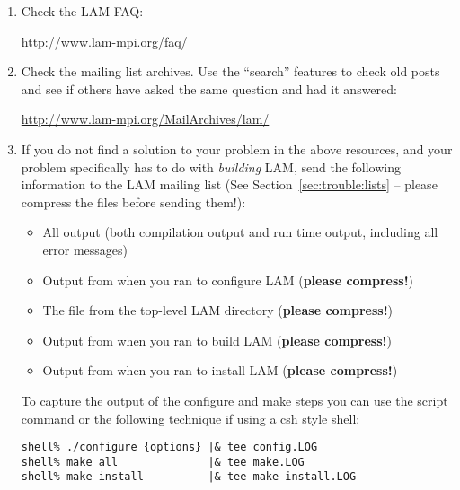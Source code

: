 \begin{enumerate}
\item Check the LAM FAQ:
 
  \vspace{11pt}

  \centerline{\url{http://www.lam-mpi.org/faq/}}
  
\item Check the mailing list archives.  Use the ``search'' features to
  check old posts and see if others have asked the same question and
  had it answered:
  
  \vspace{11pt}

  \centerline{\url{http://www.lam-mpi.org/MailArchives/lam/}}
  
\item If you do not find a solution to your problem in the above
  resources, and your problem specifically has to do with {\em
    building} LAM, send the following information to the LAM mailing
  list (See Section~\ref{sec:trouble:lists} -- please compress the
  files before sending them!):
  
  \begin{itemize}
  \item All output (both compilation output and run time output,
    including all error messages)
    
  \item Output from when you ran  to configure LAM
    ({\bf please compress!})
    
  \item The  file from the top-level LAM directory
    ({\bf please compress!})
    
  \item Output from when you ran  to build LAM ({\bf please
      compress!})
    
  \item Output from when you ran  to install LAM
    ({\bf please compress!})
  \end{itemize}

  To capture the output of the configure and make steps you can use
  the script command or the following technique if using a csh style
  shell:

\lstset{style=lam-cmdline}
\begin{lstlisting}
shell% ./configure {options} |& tee config.LOG
shell% make all              |& tee make.LOG
shell% make install          |& tee make-install.LOG
\end{lstlisting}


\end{enumerate}
